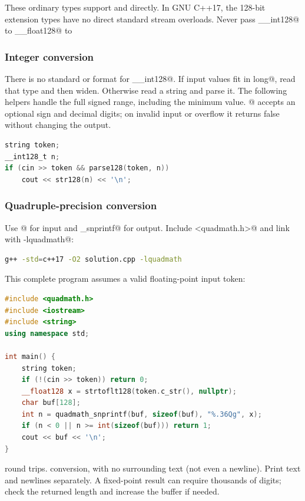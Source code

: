 These ordinary types support \verb@cin@ and \verb@cout@ directly.
In GNU C++17, the 128-bit extension types have no direct standard stream
overloads. Never pass \verb@__int128@ to \verb@%lld@ or
\verb@__float128@ to \verb@%Lf@: mismatched variadic arguments are invalid.

\subsubsection{Integer conversion}

There is no standard \verb@scanf@ or \verb@printf@ format for
\verb@__int128@. If input values fit in \verb@long long@, read that type
and then widen. Otherwise read a string and parse it. The following helpers
handle the full signed range, including the minimum value. @
accepts an optional sign and decimal digits; on invalid input or overflow
it returns false without changing the output.


\begin{lstlisting}[language=C++]
string token;
__int128_t n;
if (cin >> token && parse128(token, n))
    cout << str128(n) << '\n';
\end{lstlisting}

\subsubsection{Quadruple-precision conversion}

Use @ for input and \verb@quadmath_snprintf@ for output.
Include \verb@<quadmath.h>@ and link with \verb@-lquadmath@:
\begin{lstlisting}[language=bash]
g++ -std=c++17 -O2 solution.cpp -lquadmath
\end{lstlisting}

This complete program assumes a valid floating-point input token:
\begin{lstlisting}[language=C++,label=quadmath-example]
#include <quadmath.h>
#include <iostream>
#include <string>
using namespace std;

int main() {
    string token;
    if (!(cin >> token)) return 0;
    __float128 x = strtoflt128(token.c_str(), nullptr);
    char buf[128];
    int n = quadmath_snprintf(buf, sizeof(buf), "%.36Qg", x);
    if (n < 0 || n >= int(sizeof(buf))) return 1;
    cout << buf << '\n';
}
\end{lstlisting}

\verb@%.36Qg@ prints 36 significant digits, sufficient for binary128
round trips. \verb@%.15Qf@ prints 15 digits after the decimal point;
\verb@%Qe@ uses scientific notation. The format must contain exactly one
conversion, with no surrounding text (not even a newline). Print text and
newlines separately. A fixed-point result can require thousands of digits;
check the returned length and increase the buffer if needed.

